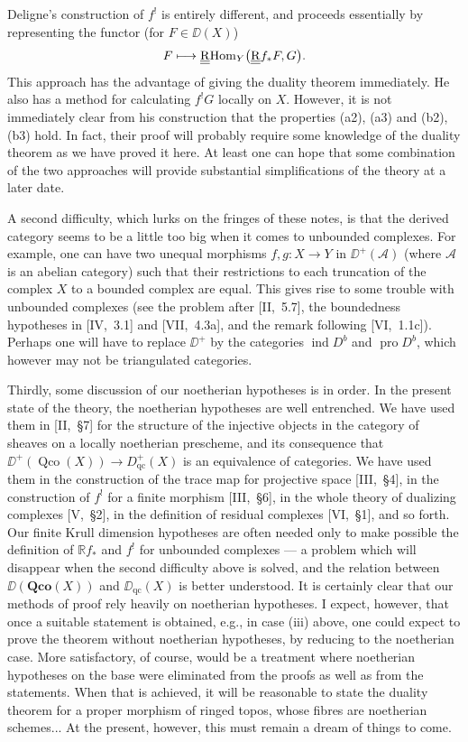 Deligne's construction of $f^{!}$ is entirely different, and proceeds essentially by representing the functor (for $F\in \DD(X)$)
\[
F\longmapsto \underline{\underline{\operatorname{R}}}{\operatorname{Hom}}_{Y}\bigl(\underline{\underline{\operatorname{R}}} f_{*}F,G\bigr).
\]
This approach has the advantage of giving the duality theorem immediately. He also has a method for calculating $f^{!}G$ locally on $X$. However, it is not immediately clear from his construction that the properties (a2), (a3) and (b2), (b3) hold. In fact, their proof will probably require some knowledge of the duality theorem as we have proved it here. At least one can hope that some combination of the two approaches will provide substantial simplifications of the theory at a later date.

A second difficulty, which lurks on the fringes of these notes, is that the derived category seems to be a little too big when it comes to unbounded complexes. For example, one can have two unequal morphisms $f,g\colon X\to Y$ in $\DD^{+}(\mathcal{A})$ (where $\mathcal{A}$ is an abelian category) such that their restrictions to each truncation of the complex $X$ to a bounded complex are equal. This gives rise to some trouble with unbounded complexes (see the problem after [II,~5.7], the boundedness hypotheses in [IV,~3.1] and [VII,~4.3a], and the remark following [VI,~1.1c]). Perhaps one will have to replace $\DD^{+}$ by the categories $\operatorname{ind}D^{b}$ and $\operatorname{pro}D^{b}$, which however may not be triangulated categories.

Thirdly, some discussion of our noetherian hypotheses is in order. In the present state of the theory, the noetherian hypotheses are well entrenched. We have used them in [II,~\S7] for the structure of the injective objects in the category of sheaves on a locally noetherian prescheme, and its consequence that $\DD^{+}(\operatorname{Qco}(X))\to D_{\operatorname{qc}}^{+}(X)$ is an equivalence of categories. We have used them in the construction of the trace map for projective space [III,~\S4], in the construction of $f^{!}$ for a finite morphism [III,~\S6], in the whole theory of dualizing complexes [V,~\S2], in the definition of residual complexes [VI,~\S1], and so forth. Our finite Krull dimension hypotheses are often needed only to make possible the definition of $\mathbb{R}f_{*}$ and $f^{!}$ for unbounded complexes — a problem which will disappear when the second difficulty above is solved, and the relation between $\DD(\mathbf{Qco}(X))$ and $\DD_{\mathrm{qc}}(X)$ is better understood. It is certainly clear that our methods of proof rely heavily on noetherian hypotheses. I expect, however, that once a suitable statement is obtained, e.g., in case (iii) above, one could expect to prove the theorem without noetherian hypotheses, by reducing to the noetherian case. More satisfactory, of course, would be a treatment where noetherian hypotheses on the base were eliminated from the proofs as well as from the statements. When that is achieved, it will be reasonable to state the duality theorem for a proper morphism of ringed topos, whose fibres are noetherian schemes... At the present, however, this must remain a dream of things to come.

